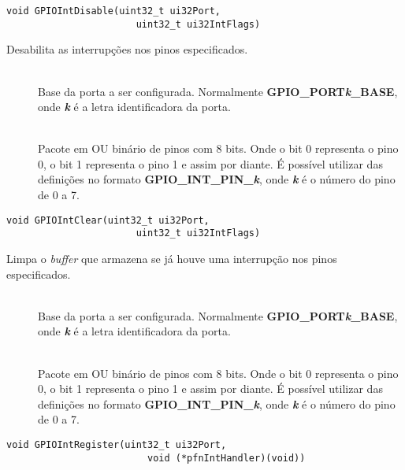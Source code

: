 \begin{lstlisting}[style=funcao]
	void GPIOIntDisable(uint32_t ui32Port,
					   uint32_t ui32IntFlags)
\end{lstlisting}

Desabilita as interrupções nos pinos especificados.

\begin{description}
	\item []\hfill \\
	Base da porta a ser configurada. Normalmente \textbf{GPIO\_PORT\emph{k}\_BASE}, onde \textbf{\emph{k}} é a letra identificadora da porta.
	
	\item []\hfill \\
	Pacote em OU binário de pinos com 8 bits. Onde o bit 0 representa o pino 0, o bit 1 representa o pino 1 e assim por diante. É possível utilizar das definições no formato  \textbf{GPIO\_INT\_PIN\_\emph{k}}, onde \textbf{\emph{k}} é o número do pino de 0 a 7.
\end{description}

\begin{lstlisting}[style=funcao]
	void GPIOIntClear(uint32_t ui32Port,
					   uint32_t ui32IntFlags)
\end{lstlisting}

Limpa o \emph{buffer} que armazena se já houve uma interrupção nos pinos especificados.

\begin{description}
	\item []\hfill \\
	Base da porta a ser configurada. Normalmente \textbf{GPIO\_PORT\emph{k}\_BASE}, onde \textbf{\emph{k}} é a letra identificadora da porta.
	
	\item []\hfill \\
	Pacote em OU binário de pinos com 8 bits. Onde o bit 0 representa o pino 0, o bit 1 representa o pino 1 e assim por diante. É possível utilizar das definições no formato  \textbf{GPIO\_INT\_PIN\_\emph{k}}, onde \textbf{\emph{k}} é o número do pino de 0 a 7.
\end{description}

\begin{lstlisting}[style=funcao]
	void GPIOIntRegister(uint32_t ui32Port,
						 void (*pfnIntHandler)(void))
\end{lstlisting}

